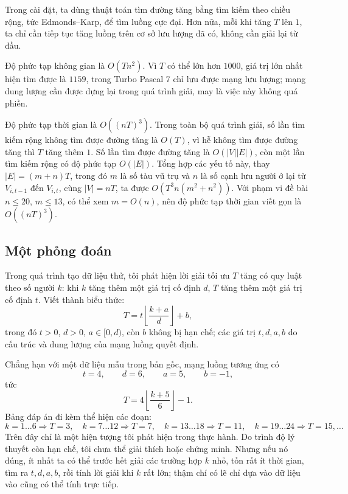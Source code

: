 \documentclass[11pt]{article}
\begin{document}
Trong cài đặt, ta dùng thuật toán tìm đường tăng bằng tìm kiếm theo chiều
rộng, tức Edmonds--Karp, để tìm luồng cực đại. Hơn nữa, mỗi khi tăng \(T\)
lên \(1\), ta chỉ cần tiếp tục tăng luồng trên cơ sở lưu lượng đã có, không
cần giải lại từ đầu.

Độ phức tạp không gian là \(O(Tn^2)\). Vì \(T\) có thể lớn hơn \(1000\), giá
trị lớn nhất hiện tìm được là \(1159\), trong Turbo Pascal 7 chỉ lưu được
mạng lưu lượng; mạng dung lượng cần được dựng lại trong quá trình giải, may
là việc này không quá phiền.

Độ phức tạp thời gian là \(O((nT)^3)\). Trong toàn bộ quá trình giải, số lần
tìm kiếm rộng không tìm được đường tăng là \(O(T)\), vì hễ không tìm được
đường tăng thì \(T\) tăng thêm \(1\). Số lần tìm được đường tăng là
\(O(|V||E|)\), còn một lần tìm kiếm rộng có độ phức tạp \(O(|E|)\). Tổng hợp
các yếu tố này, thay \(|E|=(m+n)T\), trong đó \(m\) là số tàu vũ trụ và \(n\)
là số cạnh lưu người ở lại từ \(V_{i,t-1}\) đến \(V_{i,t}\), cùng
\(|V|=nT\), ta được \(O(T^3n(m^2+n^2))\). Với phạm vi đề bài
\(n\le20\), \(m\le13\), có thể xem \(m=O(n)\), nên độ phức tạp thời gian viết
gọn là \(O((nT)^3)\).

\subsection{Một phỏng đoán}

Trong quá trình tạo dữ liệu thử, tôi phát hiện lời giải tối ưu \(T\) tăng có
quy luật theo số người \(k\): khi \(k\) tăng thêm một giá trị cố định \(d\),
\(T\) tăng thêm một giá trị cố định \(t\). Viết thành biểu thức:
\[
  T=t\left\lfloor\frac{k+a}{d}\right\rfloor+b,
\]
trong đó \(t>0\), \(d>0\), \(a\in[0,d)\), còn \(b\) không bị hạn chế; các giá
trị \(t,d,a,b\) do cấu trúc và dung lượng của mạng luồng quyết định.

Chẳng hạn với một dữ liệu mẫu trong bản gốc, mạng luồng tương ứng có
\[
  t=4,\qquad d=6,\qquad a=5,\qquad b=-1,
\]
tức
\[
  T=4\left\lfloor\frac{k+5}{6}\right\rfloor-1.
\]
Bảng đáp án đi kèm thể hiện các đoạn:
\[
  k=1\ldots6\Rightarrow T=3,\quad
  k=7\ldots12\Rightarrow T=7,\quad
  k=13\ldots18\Rightarrow T=11,\quad
  k=19\ldots24\Rightarrow T=15,\ldots
\]
Trên đây chỉ là một hiện tượng tôi phát hiện trong thực hành. Do trình độ lý
thuyết còn hạn chế, tôi chưa thể giải thích hoặc chứng minh. Nhưng nếu nó
đúng, ít nhất ta có thể trước hết giải các trường hợp \(k\) nhỏ, tốn rất ít
thời gian, tìm ra \(t,d,a,b\), rồi tính lời giải khi \(k\) rất lớn; thậm chí
có lẽ chỉ dựa vào dữ liệu vào cũng có thể tính trực tiếp.
\end{document}

